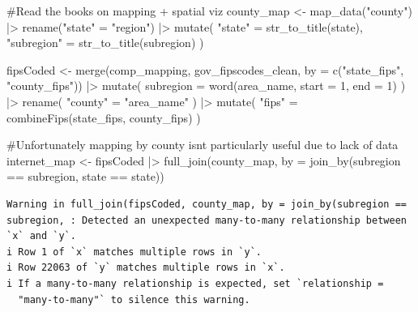 \documentclass[
  letterpaper,
  DIV=11,
  numbers=noendperiod]{scrartcl}
\newenvironment{Shaded}{\begin{snugshade}}{\end{snugshade}}
\newcommand{\AttributeTok}[1]{\textcolor[rgb]{0.40,0.45,0.13}{#1}}
\newcommand{\CommentTok}[1]{\textcolor[rgb]{0.37,0.37,0.37}{#1}}
\newcommand{\DecValTok}[1]{\textcolor[rgb]{0.68,0.00,0.00}{#1}}
\newcommand{\FunctionTok}[1]{\textcolor[rgb]{0.28,0.35,0.67}{#1}}
\newcommand{\NormalTok}[1]{\textcolor[rgb]{0.00,0.23,0.31}{#1}}
\newcommand{\OtherTok}[1]{\textcolor[rgb]{0.00,0.23,0.31}{#1}}
\newcommand{\SpecialCharTok}[1]{\textcolor[rgb]{0.37,0.37,0.37}{#1}}
\newcommand{\StringTok}[1]{\textcolor[rgb]{0.13,0.47,0.30}{#1}}
\begin{document}
\begin{Shaded}
\begin{Highlighting}[]
\CommentTok{\#Read the books on mapping + spatial viz}
\NormalTok{county\_map }\OtherTok{\textless{}{-}} \FunctionTok{map\_data}\NormalTok{(}\StringTok{"county"}\NormalTok{) }\SpecialCharTok{|\textgreater{}}
  \FunctionTok{rename}\NormalTok{(}\StringTok{"state"} \OtherTok{=} \StringTok{"region"}\NormalTok{) }\SpecialCharTok{|\textgreater{}}
  \FunctionTok{mutate}\NormalTok{(}
    \StringTok{"state"} \OtherTok{=} \FunctionTok{str\_to\_title}\NormalTok{(state),}
    \StringTok{"subregion"} \OtherTok{=} \FunctionTok{str\_to\_title}\NormalTok{(subregion)}
\NormalTok{    )}

\NormalTok{fipsCoded }\OtherTok{\textless{}{-}} \FunctionTok{merge}\NormalTok{(comp\_mapping, gov\_fipscodes\_clean, }\AttributeTok{by =} \FunctionTok{c}\NormalTok{(}\StringTok{"state\_fips"}\NormalTok{, }\StringTok{"county\_fips"}\NormalTok{)) }\SpecialCharTok{|\textgreater{}}
  \FunctionTok{mutate}\NormalTok{(}
    \AttributeTok{subregion =} \FunctionTok{word}\NormalTok{(area\_name, }\AttributeTok{start =} \DecValTok{1}\NormalTok{, }\AttributeTok{end =} \DecValTok{1}\NormalTok{)}
\NormalTok{  ) }\SpecialCharTok{|\textgreater{}}
  \FunctionTok{rename}\NormalTok{(}
    \StringTok{"county"} \OtherTok{=} \StringTok{"area\_name"}
\NormalTok{  ) }\SpecialCharTok{|\textgreater{}}
  \FunctionTok{mutate}\NormalTok{(}
    \StringTok{"fips"} \OtherTok{=} \FunctionTok{combineFips}\NormalTok{(state\_fips, county\_fips)}
\NormalTok{  )}

\CommentTok{\#Unfortunately mapping by county isn\textquotesingle{}t particularly useful due to lack of data}
\NormalTok{internet\_map }\OtherTok{\textless{}{-}}\NormalTok{ fipsCoded }\SpecialCharTok{|\textgreater{}}
  \FunctionTok{full\_join}\NormalTok{(county\_map, }\AttributeTok{by =} \FunctionTok{join\_by}\NormalTok{(subregion }\SpecialCharTok{==}\NormalTok{ subregion, state }\SpecialCharTok{==}\NormalTok{ state))}
\end{Highlighting}
\end{Shaded}

\begin{verbatim}
Warning in full_join(fipsCoded, county_map, by = join_by(subregion == subregion, : Detected an unexpected many-to-many relationship between `x` and `y`.
i Row 1 of `x` matches multiple rows in `y`.
i Row 22063 of `y` matches multiple rows in `x`.
i If a many-to-many relationship is expected, set `relationship =
  "many-to-many"` to silence this warning.
\end{verbatim}
\end{document}
